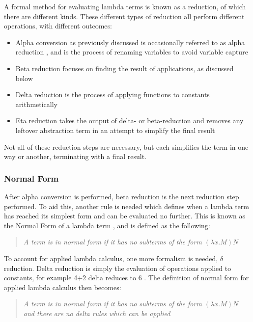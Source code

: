 \documentclass[a4paper,12pt]{report}
\begin{document}
A formal method for evaluating lambda terms is known as a reduction, of which there are different kinds. These different types of reduction all perform different operations, with different outcomes:

\begin{itemize}
	\item Alpha conversion as previously discussed is occasionally referred to as alpha reduction \cite{Horowitz2013}, and is the process of renaming variables to avoid variable capture
	\item Beta reduction focuses on finding the result of applications, as discussed below
	\item Delta reduction is the process of applying functions to constants arithmetically
	\item Eta reduction takes the output of delta- or beta-reduction and removes any leftover abstraction term in an attempt to simplify the final result \cite{Sookocheff2018Eta}	
\end{itemize}

Not all of these reduction steps are necessary, but each simplifies the term in one way or another, terminating with a final result.

\subsubsection{Normal Form}

After alpha conversion is performed, beta reduction is the next reduction step performed. To aid this, another rule is needed which defines when a lambda term has reached its simplest form and can be evaluated no further. This is known as the Normal Form of a lambda term \cite{Barendregt2000}, and is defined as the following:

\begin{quote}
	\centering
	\textit{A term is in normal form if it has no subterms of the form $(\lambda x.M)N$\cite{Hankin2004}}
\end{quote}

To account for applied lambda calculus, one more formalism is needed, $\delta$ reduction. Delta reduction is simply the evaluation of operations applied to constants, for example 4+2 delta reduces to 6 \cite{Slonneger1995} \cite{Scott2016}. The definition of normal form for applied lambda calculus then becomes:

\begin{quote}
	\centering
	\textit{A term is in normal form if it has no subterms of the form $(\lambda x.M)N$\cite{Hankin2004} and there are no delta rules which can be applied \cite{Slonneger1995}}
\end{quote}
\end{document}
